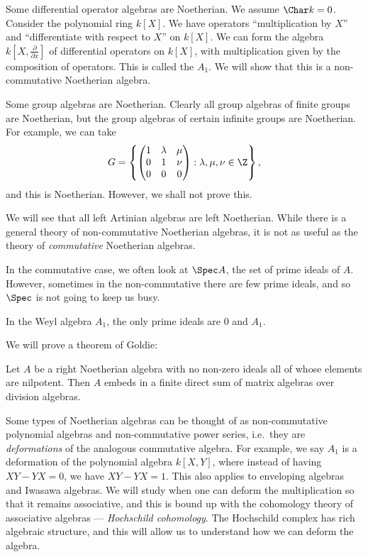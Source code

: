 \documentclass[a4paper]{article}
\begin{document}
\begin{eg}
  Some differential operator algebras are Noetherian. We assume $\Char k = 0$. Consider the polynomial ring $k[X]$. We have operators ``multiplication by $X$'' and ``differentiate with respect to $X$'' on $k[X]$. We can form the algebra $k[X, \frac{\partial}{\partial x}]$ of differential operators on $k[X]$, with multiplication given by the composition of operators. This is called the  $A_1$. We will show that this is a non-commutative Noetherian algebra.
\end{eg}

\begin{eg}
  Some group algebras are Noetherian. Clearly all group algebras of finite groups are Noetherian, but the group algebras of certain infinite groups are Noetherian. For example, we can take
  \[
    G = \left\{
      \begin{pmatrix}
        1 & \lambda & \mu\\
        0 & 1 & \nu\\
        0 & 0 & 0
      \end{pmatrix}: \lambda, \mu, \nu \in \Z
    \right\},
  \]
  and this is Noetherian. However, we shall not prove this.
\end{eg}

We will see that all left Artinian algebras are left Noetherian. While there is a general theory of non-commutative Noetherian algebras, it is not as useful as the theory of \emph{commutative} Noetherian algebras.

In the commutative case, we often look at $\Spec A$, the set of prime ideals of $A$. However, sometimes in the non-commutative there are few prime ideals, and so $\Spec$ is not going to keep us busy.
\begin{eg}
  In the Weyl algebra $A_1$, the only prime ideals are $0$ and $A_1$.
\end{eg}

We will prove a theorem of Goldie:
\begin{thm}
  Let $A$ be a right Noetherian algebra with no non-zero ideals all of whose elements are nilpotent. Then $A$ embeds in a finite direct sum of matrix algebras over division algebras.
\end{thm}

Some types of Noetherian algebras can be thought of as non-commutative polynomial algebras and non-commutative power series, i.e.\ they are \emph{deformations} of the analogous commutative algebra. For example, we say $A_1$ is a deformation of the polynomial algebra $k[X, Y]$, where instead of having $XY - YX = 0$, we have $XY - YX = 1$. This also applies to enveloping algebras and Iwasawa algebras. We will study when one can deform the multiplication so that it remains associative, and this is bound up with the cohomology theory of associative algebras --- \emph{Hochschild cohomology}. The Hochschild complex has rich algebraic structure, and this will allow us to understand how we can deform the algebra.
\end{document}
